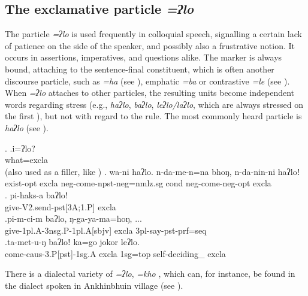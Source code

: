 \subsection{The exclamative particle \emph{=ʔlo}}
 
 The particle \emph{=ʔlo} is used frequently in colloquial speech, signalling a certain lack of patience on the side of the speaker, and possibly also a frustrative notion. It occurs in assertions, imperatives, and questions alike. The marker is always bound, attaching to the sentence-final constituent, which is often another discourse particle, such as \emph{=ha} (see  ), emphatic \emph{=ba} or contrastive \emph{=le} (see \Next). When \emph{=ʔlo} attaches to other particles, the resulting units become independent words regarding  stress (e.g., \emph{haʔlo}, \emph{baʔlo}, \emph{leʔlo/laʔlo}, which are always stressed on the first ), but not with regard to the  rule. The most commonly heard particle is \emph{haʔlo} (see \Next[b]).

\ex. \ag.i=ʔlo?\\
what{\sc =excla}\\
 (also used as a filler, like )
\bg. wa-ni haʔlo. n-da-me-n=na bhoŋ, n-da-nin-ni haʔloǃ\\
			exist{\sc [3sg]-opt} {\sc excla} {\sc neg-}come{\sc [3sg]-npst-neg=nmlz.sg} {\sc cond} {\sc neg-}come{\sc [3sg]-neg-opt} {\sc excla}\\
	\bg. pi-haks-a baʔlo!\\
	give{\sc -V2.send-pst[3A;1.P]} {\sc excla}\\
	 
\bg.pi-m-ci-m baʔlo, ŋ-ga-ya-ma=hoŋ, ...\\
 give{\sc -1pl.A-3nsg.P-1pl.A[sbjv]} {\sc excla} {\sc 3pl-}say{\sc -pst-prf=seq}\\
  \bg.ta-met-u-ŋ baʔloǃ  ka=go     jokor leʔlo.\\
come{\sc -caus-3.P[pst]-1sg.A} {\sc excla} {\sc 1sg=top} self-deciding\_ {\sc excla}\\
  

There is a dialectal variety of \emph{=ʔlo}, \emph{=kho} , which can, for instance, be found in the dialect spoken in Ankhinbhuin village (see \Next).


